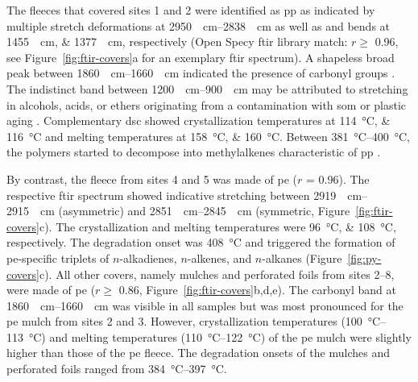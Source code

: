 The fleeces that covered sites 1 and 2 were identified as \ac{pp} as indicated by multiple  stretch deformations at \SIrange{2950}{2838}{\per\centi\meter} as well as  and  bends at \SIlist{1455;1377}{\per\centi\meter}, respectively (Open Specy \ac{ftir} library match: $r \geq$ \num{0.96}, see Figure~\ref{fig:ftir-covers}a for an exemplary \ac{ftir} spectrum). A shapeless broad peak between \SIrange[range-phrase={ and }]{1860}{1660}{\per\centi\meter} indicated the presence of carbonyl groups \citep{GrauseChanges2020}. The indistinct band between \SIrange[range-phrase={ and }]{1200}{900}{\per\centi\meter} may be attributed to  stretching in alcohols, acids, or ethers originating from a contamination with \ac{som} or plastic aging \citep{FuMechanism2021}. Complementary \ac{dsc} showed crystallization temperatures at \SIlist{114;116}{\degreeCelsius} and melting temperatures at \SIlist{158;160}{\degreeCelsius}. Between \SIrange[range-phrase={ and }]{381}{400}{\degreeCelsius}, the polymers started to decompose into methylalkenes characteristic of \ac{pp} \citep[Figure~\ref{fig:py-covers}a for an exemplary pyrogram]{TsugePyrolysis2011}.

By contrast, the fleece from sites 4 and 5 was made of \ac{pe} ($r$ = \num{0.96}). The respective \ac{ftir} spectrum showed indicative  stretching between \SIrange{2919}{2915}{\per\centi\meter} (asymmetric)
and \SIrange{2851}{2845}{\per\centi\meter} (symmetric, Figure~\ref{fig:ftir-covers}c). The crystallization and melting temperatures were \SIlist{96;108}{\degreeCelsius}, respectively. The degradation onset was \SI{408}{\degreeCelsius} and triggered the formation of \ac{pe}-specific triplets of $n$-alkadienes, $n$-alkenes, and $n$-alkanes (Figure~\ref{fig:py-covers}c).
All other covers, namely mulches and perforated foils from sites 2--8, were made of \ac{pe} ($r \geq$ 0.86, Figure~\ref{fig:ftir-covers}b,d,e). The carbonyl band at \SIrange{1860}{1660}{\per\centi\meter} was visible in all samples but was most pronounced for the \ac{pe} mulch from sites 2 and 3. However, crystallization temperatures (\SIrange{100}{113}{\degreeCelsius}) and melting temperatures (\SIrange{110}{122}{\degreeCelsius}) of the \ac{pe} mulch were slightly higher than those of the \ac{pe} fleece. The degradation onsets of the mulches and perforated foils ranged from \SIrange[range-phrase={ to }]{384}{397}{\degreeCelsius}.

